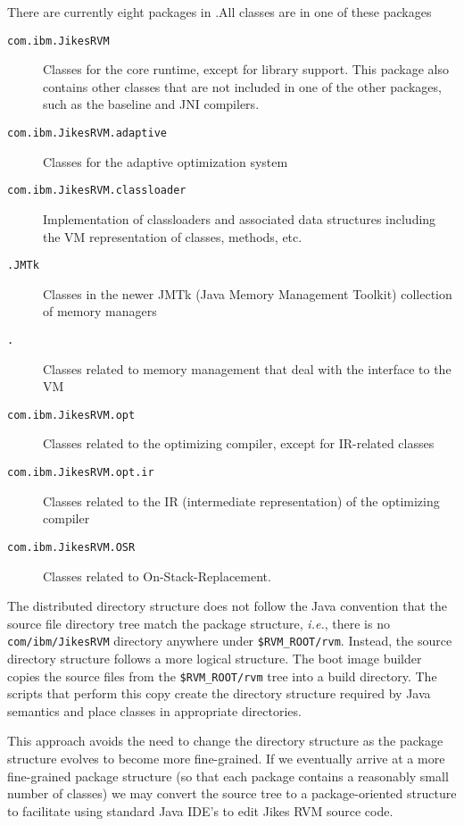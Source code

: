 There are currently eight packages in \jrvm.\@  All classes are in
one of these packages
\begin{description}
\item[\texttt{com.ibm.JikesRVM}] Classes for the core runtime, except for library
support.  This package also contains other classes that are not
included in one of the other packages, such as the baseline and JNI
compilers. 

\item[\texttt{com.ibm.JikesRVM.adaptive}] Classes for the adaptive optimization system

\item[\texttt{com.ibm.JikesRVM.classloader}] Implementation of classloaders
and associated data structures including the VM representation of classes,
methods, etc. 

\item[\texttt{\MMpackage{}\-.JMTk}] Classes in the newer JMTk
(Java\TMweb{} Memory Management Toolkit) collection of memory managers

\item[\texttt{\MMpackage\-.\vmInterface{}}] Classes related to
memory management that deal with the interface to the VM

\item[\texttt{com.ibm.JikesRVM.opt}] Classes related to the optimizing
compiler, except for IR-related classes

\item[\texttt{com.ibm.JikesRVM.opt.ir}] Classes related to the IR
(intermediate representation) of the optimizing compiler

\item[\texttt{com.ibm.JikesRVM.OSR}] Classes related to On-Stack-Replacement. 

\end{description}

The distributed directory structure
does not follow the Java convention that the source file directory tree
match the package structure, {\it i.e.},
there is no {\tt com/ibm/JikesRVM} directory anywhere under \texttt{\$RVM\_ROOT/rvm}.  Instead, the source directory structure follows a more logical 
structure.  The boot image builder
copies the source files from the \texttt{\$RVM\_ROOT/rvm} tree into a build
directory.  The scripts that perform this copy create the directory
structure required by Java semantics and place classes in appropriate
directories.

This approach avoids the need to change the directory structure as the
package structure evolves to become more fine-grained. If we
eventually arrive at a more fine-grained package structure (so that
each package contains a reasonably small number of classes) we may
convert the source tree to a package-oriented structure to facilitate
using standard Java IDE's to edit Jikes RVM source code.
